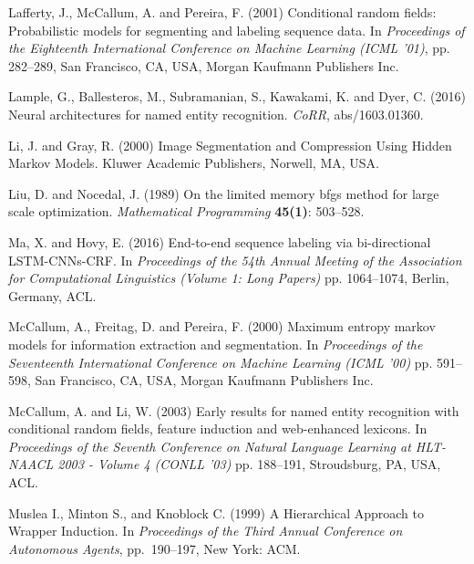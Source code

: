 \documentclass{nle}
\begin{document}
\begin{thebibliography}{}
Lafferty, J., McCallum, A. and Pereira, F. (2001)
Conditional random fields: Probabilistic models for segmenting and labeling sequence data.
In {\it Proceedings of the Eighteenth International Conference on Machine Learning (ICML '01)}, 
pp. 282--289, San Francisco, CA, USA, Morgan Kaufmann Publishers Inc.

Lample, G., Ballesteros, M., Subramanian, S., Kawakami, K. and Dyer, C. (2016)
Neural architectures for named entity recognition.
{\it CoRR}, abs/1603.01360.

Li, J. and Gray, R. (2000)
Image Segmentation and Compression Using Hidden Markov Models.
Kluwer Academic Publishers, Norwell, MA, USA.

Liu, D. and Nocedal, J. (1989)
On the limited memory bfgs method for large scale optimization.
{\it Mathematical Programming}
{\bf 45(1)}: 503--528.

Ma, X. and Hovy, E. (2016)
End-to-end sequence labeling via bi-directional {LSTM}-{CNN}s-{CRF}.
In {\it Proceedings of the 54th Annual Meeting of the Association for Computational Linguistics (Volume 1: Long Papers)}
pp. 1064--1074, Berlin, Germany, ACL.

McCallum, A., Freitag, D. and Pereira, F. (2000)
Maximum entropy markov models for information extraction and segmentation.
In {\it Proceedings of the Seventeenth International Conference on Machine Learning (ICML '00)}
pp. 591--598, San Francisco, CA, USA, Morgan Kaufmann Publishers Inc.

McCallum, A. and Li, W. (2003)
Early results for named entity recognition with conditional random fields, feature induction and web-enhanced lexicons.
In {\it Proceedings of the Seventh Conference on Natural Language Learning at HLT-NAACL 2003 - Volume 4 (CONLL '03)}
pp. 188--191, Stroudsburg, PA, USA, ACL.

Muslea I., Minton S., and Knoblock C. (1999) 
A Hierarchical Approach to Wrapper Induction.
In {\it Proceedings of the Third Annual Conference on Autonomous Agents}, 
pp.~190--197, New York: ACM.


\end{thebibliography}
\end{document}
